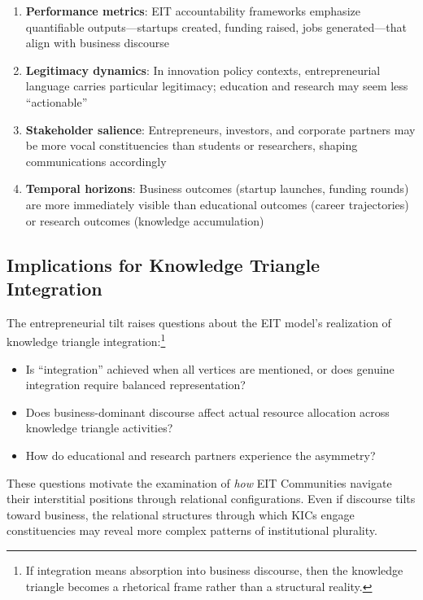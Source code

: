 \documentclass[../main.tex]{subfiles}
\begin{document}
\begin{enumerate}
    \item \textbf{Performance metrics}: EIT accountability frameworks emphasize quantifiable outputs---startups created, funding raised, jobs generated---that align with business discourse

    \item \textbf{Legitimacy dynamics}: In innovation policy contexts, entrepreneurial language carries particular legitimacy; education and research may seem less ``actionable''

    \item \textbf{Stakeholder salience}: Entrepreneurs, investors, and corporate partners may be more vocal constituencies than students or researchers, shaping communications accordingly

    \item \textbf{Temporal horizons}: Business outcomes (startup launches, funding rounds) are more immediately visible than educational outcomes (career trajectories) or research outcomes (knowledge accumulation)
\end{enumerate}

\subsection{Implications for Knowledge Triangle Integration}

The entrepreneurial tilt raises questions about the EIT model's realization of knowledge triangle integration:\footnote{If integration means absorption into business discourse, then the knowledge triangle becomes a rhetorical frame rather than a structural reality.}

\begin{itemize}
    \item Is ``integration'' achieved when all vertices are mentioned, or does genuine integration require balanced representation?
    \item Does business-dominant discourse affect actual resource allocation across knowledge triangle activities?
    \item How do educational and research partners experience the asymmetry?
\end{itemize}

These questions motivate the examination of \textit{how} EIT Communities navigate their interstitial positions through relational configurations. Even if discourse tilts toward business, the relational structures through which KICs engage constituencies may reveal more complex patterns of institutional plurality.
\end{document}
